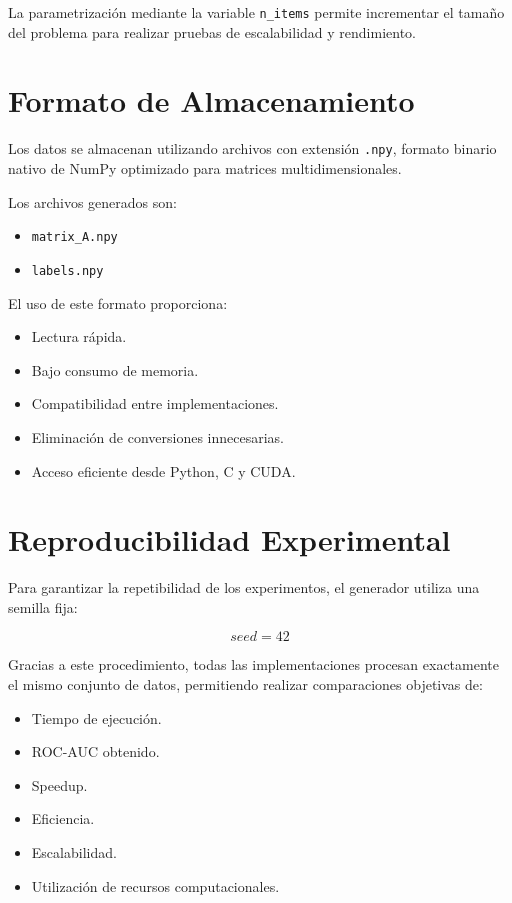 La parametrización mediante la variable \texttt{n\_items} permite incrementar el tamaño del problema para realizar pruebas de escalabilidad y rendimiento.

\section{Formato de Almacenamiento}

Los datos se almacenan utilizando archivos con extensión \texttt{.npy}, formato binario nativo de NumPy optimizado para matrices multidimensionales.

Los archivos generados son:

\begin{itemize}
\item \texttt{matrix\_A.npy}
\item \texttt{labels.npy}
\end{itemize}

El uso de este formato proporciona:

\begin{itemize}
\item Lectura rápida.
\item Bajo consumo de memoria.
\item Compatibilidad entre implementaciones.
\item Eliminación de conversiones innecesarias.
\item Acceso eficiente desde Python, C y CUDA.
\end{itemize}

\section{Reproducibilidad Experimental}

Para garantizar la repetibilidad de los experimentos, el generador utiliza una semilla fija:

\[
seed = 42
\]

Gracias a este procedimiento, todas las implementaciones procesan exactamente el mismo conjunto de datos, permitiendo realizar comparaciones objetivas de:

\begin{itemize}
\item Tiempo de ejecución.
\item ROC-AUC obtenido.
\item Speedup.
\item Eficiencia.
\item Escalabilidad.
\item Utilización de recursos computacionales.
\end{itemize}

